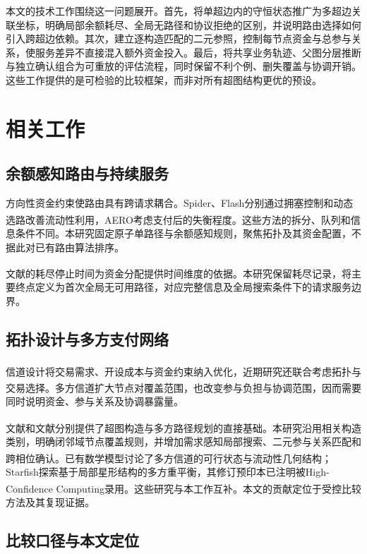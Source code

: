\documentclass[UTF8,a4paper,twocolumn,fontset=none,zihao=5]{ctexart}
\newcommand{\upcite}[1]{\textsuperscript{\cite{#1}}}
\begin{document}
本文的技术工作围绕这一问题展开。首先，将单超边内的守恒状态推广为多超边关联坐标，明确局部余额耗尽、全局无路径和协议拒绝的区别，并说明路由选择如何引入跨超边依赖。其次，建立逐构造匹配的二元参照，控制每节点资金与总参与关系，使服务差异不直接混入额外资金投入。最后，将共享业务轨迹、父图分层推断与独立确认组合为可重放的评估流程，同时保留不利个例、删失覆盖与协调开销。这些工作提供的是可检验的比较框架，而非对所有超图结构更优的预设。


\section{相关工作}

\subsection{余额感知路由与持续服务}

方向性资金约束使路由具有跨请求耦合。Spider、Flash分别通过拥塞控制和动态选路改善流动性利用\upcite{r3,r4}，AERO考虑支付后的失衡程度\upcite{r12}。这些方法的拆分、队列和信息条件不同。本研究固定原子单路径与余额感知规则，聚焦拓扑及其资金配置，不据此对已有路由算法排序。


文献\upcite{r9}的耗尽停止时间为资金分配提供时间维度的依据。本研究保留耗尽记录，将主要终点定义为首次全局无可用路径，对应完整信息及全局搜索条件下的请求服务边界。


\subsection{拓扑设计与多方支付网络}

信道设计将交易需求、开设成本与资金约束纳入优化\upcite{r6,r7,r8}，近期研究还联合考虑拓扑与交易选择\upcite{r13}。多方信道扩大节点对覆盖范围，也改变参与负担与协调范围\upcite{r10}，因而需要同时说明资金、参与关系及协调暴露量。


文献\upcite{r10}和文献\upcite{r11}分别提供了超图构造与多方路径规划的直接基础。本研究沿用相关构造类别，明确闭邻域节点覆盖规则，并增加需求感知局部搜索、二元参与关系匹配和跨相位确认。已有数学模型讨论了多方信道的可行状态与流动性几何结构\upcite{r14}；Starfish探索基于局部星形结构的多方重平衡，其修订预印本已注明被High-Confidence Computing录用\upcite{r15}。这些研究与本工作互补。本文的贡献定位于受控比较方法及其复现证据。


\subsection{比较口径与本文定位}
\end{document}
